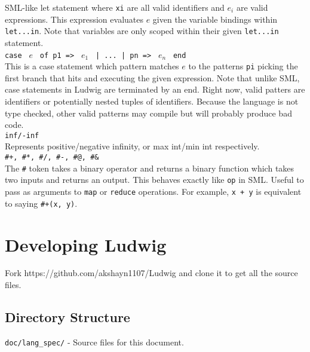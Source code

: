 \documentclass[11pt]{article}
\begin{document}
SML-like let statement where \verb|xi| are all valid identifiers and $e_i$ are valid expressions. This expression evaluates $e$ given the variable bindings within \verb|let...in|. Note that variables are only scoped within their given \verb|let...in| statement.\\

\verb|case | $e$ \verb| of p1 => | $e_1$ \verb" | ... | pn => " $e_n$ \verb| end|\\

This is a case statement which pattern matches $e$ to the patterns \verb|pi| picking the first branch that hits and executing the given expression. Note that unlike SML, case statements in Ludwig are terminated by an end. Right now, valid patters are identifiers or potentially nested tuples of identifiers. Because the language is not type checked, other valid patterns may compile but will probably produce bad code.\\

\verb|inf/-inf|\\

Represents positive/negative infinity, or max int/min int respectively.\\

\verb|#+, #*, #/, #-, #@, #&|\\

The \verb|#| token takes a binary operator and returns a binary function which takes two inputs and returns an output. This behaves exactly like \verb|op| in SML. Useful to pass as arguments to \verb|map| or \verb|reduce| operations. For example, \verb|x + y| is equivalent to saying \verb|#+(x, y)|.

\section{Developing Ludwig}

Fork https://github.com/akshayn1107/Ludwig and clone it to get all the source files.

\subsection{Directory Structure}

\verb|doc/lang_spec/| - Source files for this document.\\
\end{document}

